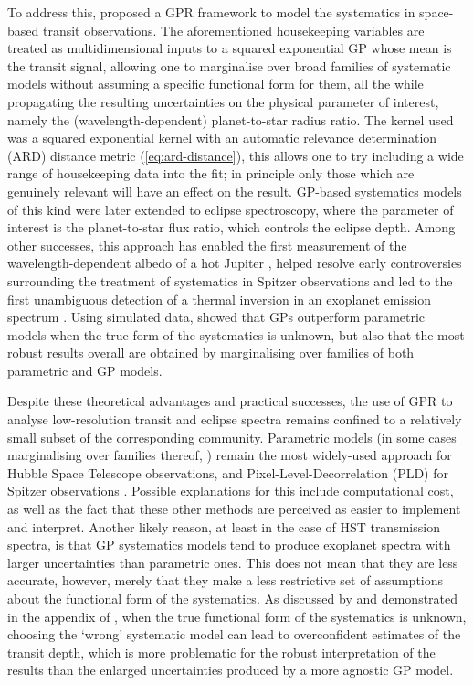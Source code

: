 \documentclass[letterpaper]{ar-1col}
\begin{document}
To address this, \citet{2012MNRAS.419.2683G} proposed a GPR framework to model the systematics in space-based transit observations. The aforementioned housekeeping variables are treated as multidimensional inputs to a squared exponential GP whose mean is the transit signal, allowing one to marginalise over broad families of systematic models without assuming a specific functional form for them, all the while propagating the resulting uncertainties on the physical parameter of interest, namely the (wavelength-dependent) planet-to-star radius ratio. The kernel used was a squared exponential kernel with an automatic relevance determination (ARD) distance metric (\autoref{eq:ard-distance}), this allows one to try including a wide range of housekeeping data into the fit; in principle only those which are genuinely relevant will have an effect on the result.
GP-based systematics models of this kind were later extended to eclipse spectroscopy, where the parameter of interest is the planet-to-star flux ratio, which controls the eclipse depth. Among other successes, this approach has enabled the first measurement of the wavelength-dependent albedo of a hot Jupiter \citep{2013ApJ...772L..16E}, helped resolve early controversies surrounding the treatment of systematics in Spitzer observations \citep{2015MNRAS.451..680E} and
led to the first unambiguous detection of a thermal inversion in an exoplanet emission spectrum \citep{2017Natur.548...58E}. Using simulated data, \citet{2014MNRAS.445.3401G} showed that GPs outperform parametric models when the true form of the systematics is unknown, but also that the most robust results overall are obtained by marginalising over families of both parametric and GP models.

Despite these theoretical advantages and practical successes, the use of GPR to analyse low-resolution transit and eclipse spectra remains confined to a relatively small subset of the corresponding community. Parametric models (in some cases marginalising over families thereof, \citealt{2016ApJ...819...10W}) remain the most widely-used approach for Hubble Space Telescope observations, and Pixel-Level-Decorrelation (PLD) for Spitzer observations \citep{2015ApJ...805..132D}. Possible explanations for this include computational cost, as well as the fact that these other methods are perceived as easier to implement and interpret. Another likely reason, at least in the case of HST transmission spectra, is that GP systematics models tend to produce exoplanet spectra with larger uncertainties than parametric ones. This does not mean that they are less accurate, however, merely that they make a less restrictive set of assumptions about the functional form of the systematics. As discussed by \citet{2014MNRAS.445.3401G} and demonstrated in the appendix of \citet{2018AJ....156..283E}, when the true functional form of the systematics is unknown, choosing the `wrong' systematic model can lead to overconfident estimates of the transit depth, which is more problematic for the robust interpretation of the results than the enlarged uncertainties produced by a more agnostic GP model.
\end{document}
